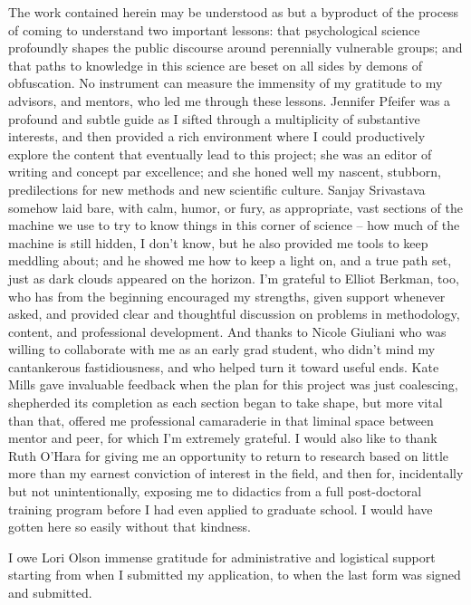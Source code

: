The work contained herein may be understood as but a byproduct of the process of coming to understand two important lessons: that psychological science profoundly shapes the public discourse around perennially vulnerable groups; and that paths to knowledge in this science are beset on all sides by demons of obfuscation.
No instrument can measure the immensity of my gratitude to my advisors, and mentors, who led me through these lessons.
Jennifer Pfeifer was a profound and subtle guide as I sifted through a multiplicity of substantive interests, and then provided a rich environment where I could productively explore the content that eventually lead to this project; she was an editor of writing and concept par excellence; and she honed well my nascent, stubborn, predilections for new methods and new scientific culture.
Sanjay Srivastava somehow laid bare, with calm, humor, or fury, as appropriate, vast sections of the machine we use to try to know things in this corner of science -- how much of the machine is still hidden, I don't know, but he also provided me tools to keep meddling about; and he showed me how to keep a light on, and a true path set, just as dark clouds appeared on the horizon.
I'm grateful to Elliot Berkman, too, who has from the beginning encouraged my strengths, given support whenever asked, and provided clear and thoughtful discussion on problems in methodology, content, and professional development.
And thanks to Nicole Giuliani who was willing to collaborate with me as an early grad student, who didn't mind my cantankerous fastidiousness, and who helped turn it toward useful ends.
Kate Mills gave invaluable feedback when the plan for this project was just coalescing, shepherded its completion as each section began to take shape, but more vital than that, offered me professional camaraderie in that liminal space between mentor and peer, for which I'm extremely grateful.
I would also like to thank Ruth O'Hara for giving me an opportunity to return to research based on little more than my earnest conviction of interest in the field, and then for, incidentally but not unintentionally, exposing me to didactics from a full post-doctoral training program before I had even applied to graduate school.
I would have gotten here so easily without that kindness.

I owe Lori Olson immense gratitude for administrative and logistical support starting from when I submitted my application, to when the last form was signed and submitted.

